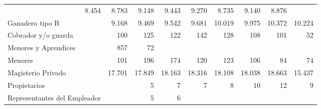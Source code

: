 \begin{tabular}{lllllllll}
  \multicolumn{1}{|r}{8.454} &
  \multicolumn{1}{r}{8.783} &
  \multicolumn{1}{r}{9.148} &
  \multicolumn{1}{r}{9.443} &
  \multicolumn{1}{r}{9.270} &
  \multicolumn{1}{r}{8.735} &
  \multicolumn{1}{r}{9.140} &
  \multicolumn{1}{r}{8.876} \\
\multicolumn{1}{l}{\hspace{1em}Ganadero tipo B} &
  \multicolumn{1}{|r}{9.168} &
  \multicolumn{1}{r}{9.469} &
  \multicolumn{1}{r}{9.542} &
  \multicolumn{1}{r}{9.681} &
  \multicolumn{1}{r}{10.019} &
  \multicolumn{1}{r}{9.975} &
  \multicolumn{1}{r}{10.372} &
  \multicolumn{1}{r}{10.224} \\
\multicolumn{1}{l}{\hspace{1em}Cobrador y/o guarda} &
  \multicolumn{1}{|r}{100} &
  \multicolumn{1}{r}{125} &
  \multicolumn{1}{r}{122} &
  \multicolumn{1}{r}{142} &
  \multicolumn{1}{r}{128} &
  \multicolumn{1}{r}{108} &
  \multicolumn{1}{r}{101} &
  \multicolumn{1}{r}{52} \\
\multicolumn{1}{l}{\hspace{1em}Menores y Aprendices} &
  \multicolumn{1}{|r}{857} &
  \multicolumn{1}{r}{72} &
  \multicolumn{1}{r}{} &
  \multicolumn{1}{r}{} &
  \multicolumn{1}{r}{} &
  \multicolumn{1}{r}{} &
  \multicolumn{1}{r}{} &
  \multicolumn{1}{r}{} \\
\multicolumn{1}{l}{\hspace{1em}Menores} &
  \multicolumn{1}{|r}{101} &
  \multicolumn{1}{r}{196} &
  \multicolumn{1}{r}{174} &
  \multicolumn{1}{r}{120} &
  \multicolumn{1}{r}{123} &
  \multicolumn{1}{r}{106} &
  \multicolumn{1}{r}{84} &
  \multicolumn{1}{r}{74} \\
\multicolumn{1}{l}{\hspace{1em}Magisterio Privado} &
  \multicolumn{1}{|r}{17.701} &
  \multicolumn{1}{r}{17.849} &
  \multicolumn{1}{r}{18.163} &
  \multicolumn{1}{r}{18.316} &
  \multicolumn{1}{r}{18.108} &
  \multicolumn{1}{r}{18.038} &
  \multicolumn{1}{r}{18.663} &
  \multicolumn{1}{r}{15.437} \\
\multicolumn{1}{l}{\hspace{1em}Propietarios} &
  \multicolumn{1}{|r}{} &
  \multicolumn{1}{r}{5} &
  \multicolumn{1}{r}{7} &
  \multicolumn{1}{r}{7} &
  \multicolumn{1}{r}{8} &
  \multicolumn{1}{r}{10} &
  \multicolumn{1}{r}{12} &
  \multicolumn{1}{r}{9} \\
\multicolumn{1}{l}{\hspace{1em}Representantes del Empleador} &
  \multicolumn{1}{|r}{} &
  \multicolumn{1}{r}{5} &
  \multicolumn{1}{r}{6} &

\end{tabular}
